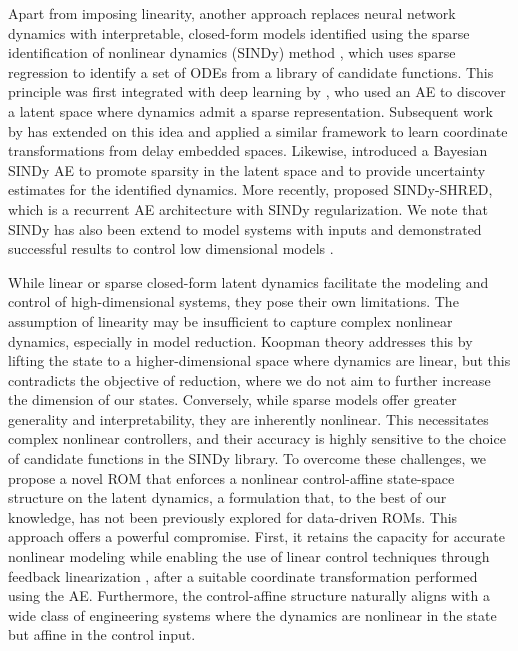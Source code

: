 \documentclass{article}
\begin{document}
Apart from imposing linearity, another approach replaces neural network dynamics with interpretable, closed-form models identified using the sparse identification of nonlinear dynamics (SINDy) method \citep{brunton2016discovering}, which uses sparse regression to identify a set of ODEs from a library of candidate functions.
This principle was first integrated with deep learning by \cite{champion2019data}, who used an AE to discover a latent space where dynamics admit a sparse representation.
Subsequent work by \cite{bakarji2023discovering} has extended on this idea and applied a similar framework to learn coordinate transformations from delay embedded spaces.
Likewise, \cite{mars2024bayesian} introduced a Bayesian SINDy AE to promote sparsity in the latent space and to provide uncertainty estimates for the identified dynamics.
More recently, \cite{gao2025sparse} proposed SINDy-SHRED, which is a recurrent AE architecture with SINDy regularization.
We note that SINDy has also been extend to model systems with inputs and demonstrated successful results to control low dimensional models \citep{brunton2025machine}.

While linear or sparse closed-form latent dynamics facilitate the modeling and control of high-dimensional systems, they pose their own limitations.
The assumption of linearity may be insufficient to capture complex nonlinear dynamics, especially in model reduction.
Koopman theory addresses this by lifting the state to a higher-dimensional space where dynamics are linear, but this contradicts the objective of reduction, where we do not aim to further increase the dimension of our states.
Conversely, while sparse models offer greater generality and interpretability, they are inherently nonlinear.
This necessitates complex nonlinear controllers, and their accuracy is highly sensitive to the choice of candidate functions in the SINDy library.
To overcome these challenges, we propose a novel ROM that enforces a nonlinear control-affine state-space structure on the latent dynamics, a formulation that, to the best of our knowledge, has not been previously explored for data-driven ROMs.
This approach offers a powerful compromise.
First, it retains the capacity for accurate nonlinear modeling while enabling the use of linear control techniques through feedback linearization \citep{isidori1995nonlinear}, after a suitable coordinate transformation performed using the AE.
Furthermore, the control-affine structure naturally aligns with a wide class of engineering systems where the dynamics are nonlinear in the state but affine in the control input. 
\end{document}

